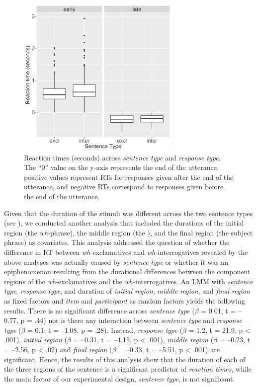 \documentclass[output=paper]{langsci/langscibook}
\begin{document}
\begin{figure}
\includegraphics[width=0.7\textwidth]{figures/KEL-img3_big.png}
\caption{Reaction times (seconds) across \textit{sentence type} and \textit{response type}. The “0” value on the y-axis represents the end of the utterance, positive values represent RTs for responses given after the end of the utterance, and negative RTs correspond to responses given before the end of the utterance.}
\label{fig:kel:3}
\end{figure}


Given that the duration of the stimuli was different across the two sentence types (see ), we conducted another analysis that included the durations of the initial region (the \textit{wh-}phrase), the middle region (the ), and the final region (the subject phrase) as covariates. This analysis addressed the question of whether the difference in RT between \textit{wh-}exclamatives and \textit{wh-}interrogatives revealed by the above analyses was actually caused by \textit{sentence type} or whether it was an epiphenomenon resulting from the durational differences between the component regions of the \textit{wh-}exclamatives and the \textit{wh-}interrogatives. An LMM with \textit{sentence type}, \textit{response type}, and duration of \textit{initial region}, \textit{middle region}, and \textit{final region} as fixed factors and \textit{item} and \textit{participant} as random factors yields the following results. There is no significant difference across \textit{sentence type} ($\beta $  = 0.01, t = –0.77, p = .44) nor is there any interaction between \textit{sentence type} and \textit{response type} ($\beta $  = 0.1, t = –1.08, p = .28). Instead, \textit{response type} ($\beta $  = 1.2, t = 21.9, p < .001), \textit{initial region} ($\beta $  = –0.31, t = –4.15, p < .001), \textit{middle region} ($\beta $  = –0.23, t = –2.56, p < .02) and \textit{final region} ($\beta $  = –0.33, t = –5.51, p < .001) are significant. Hence, the results of this analysis show that the duration of each of the three regions of the sentence is a significant predictor of \textit{reaction times}, while the main factor of our experimental design, \textit{sentence type}, is not significant.
\end{document}
